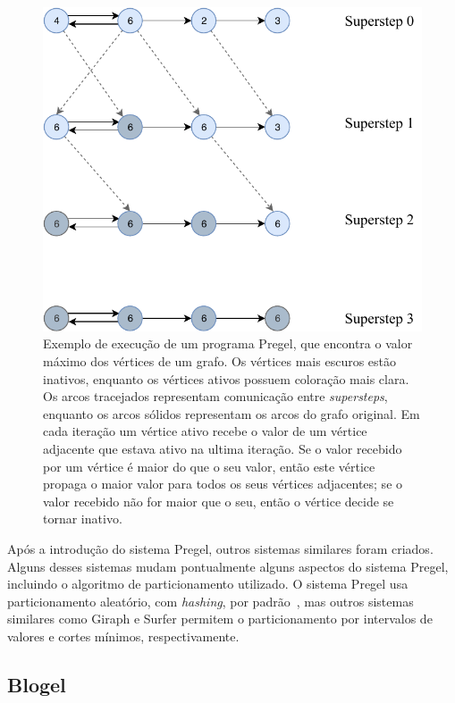 \documentclass[conference]{IEEEtran}
\begin{document}
\begin{figure}
    \begin{center}
        \includegraphics[width=.45\textwidth,
        clip]{pregel/execution_example.pdf}
    \end{center}
    \caption{Exemplo de execução de um programa Pregel, que encontra o
    valor máximo dos vértices de um grafo. Os vértices mais escuros 
    estão inativos, enquanto os vértices ativos possuem coloração mais 
    clara. Os arcos tracejados representam comunicação entre {\em
    supersteps}, enquanto os arcos sólidos representam os arcos do grafo
    original. Em cada iteração um vértice ativo recebe o valor de um
    vértice adjacente que estava ativo na ultima iteração. Se o valor
    recebido por um vértice é maior do que o seu valor, então este 
    vértice propaga o maior valor para todos os seus vértices
    adjacentes; se o valor recebido não for maior que o seu, então o
    vértice decide se tornar inativo.
    }
    \label{fig:execution_example}
\end{figure}

%
%
Após a introdução do sistema Pregel, outros sistemas similares foram
criados. Alguns desses sistemas mudam pontualmente alguns aspectos do
sistema Pregel, incluindo o algoritmo de particionamento utilizado.
O sistema Pregel usa particionamento aleatório, com {\em hashing}, por
padrão~\cite{pregel}, mas outros sistemas similares como Giraph e Surfer
permitem o particionamento por intervalos de valores e cortes mínimos,
respectivamente.

\subsection{Blogel}
\end{document}
